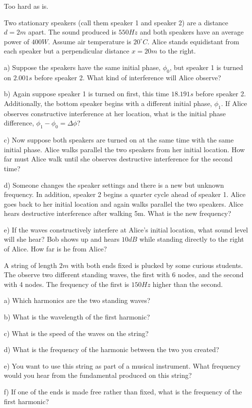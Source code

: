 \documentclass[10pt]{article}
\newenvironment{problem}[2][Problem]{\begin{trivlist}
\item[\hskip \labelsep {\bfseries #1}\hskip \labelsep {\bfseries #2.}]}{\end{trivlist}}
\begin{document}
\begin{problem}{3} Too hard as is.
\item
Two stationary speakers (call them speaker 1 and speaker 2) are a distance $d=2m$ apart. The sound produced is $550Hz$ and both speakers have an average power of $400W$. Assume air temperature is $20^\circ C$. Alice stands equidistant from each speaker but a perpendicular distance $x=20m$ to the right.
\item a) Suppose the speakers have the same initial phase, $\phi_0$, but speaker 1 is turned on $2.001s$ before speaker 2. What kind of interference will Alice observe?
\item b) Again suppose speaker 1 is turned on first, this time $18.191s$ before speaker 2. Additionally, the bottom speaker begins with a different initial phase, $\phi_1$. If Alice observes constructive interference at her location, what is the initial phase difference, $\phi_1-\phi_0=\Delta \phi$?
\item c) Now suppose both speakers are turned on at the same time with the same initial phase. Alice walks parallel the two speakers from her initial location. How far must Alice walk until she observes destructive interference for the second time?
\item d) Someone changes the speaker settings and there is a new but unknown frequency. In addition, speaker 2 begins a quarter cycle ahead of speaker 1. Alice goes back to her initial location and again walks parallel the two speakers. Alice hears destructive interference after walking 5m. What is the new frequency?
\item e) If the waves constructively interfere at Alice's initial location, what sound level will she hear? Bob shows up and hears $10dB$ while standing directly to the right of Alice. How far is he from Alice?

\end{problem}

\begin{problem}{4}
A string of length $2m$ with both ends fixed is plucked by some curious students. The observe two different standing waves, the first with 6 nodes, and the second with 4 nodes. The frequency of the first is $150Hz$ higher than the second.
\item a) Which harmonics are the two standing waves?
\item b) What is the wavelength of the first harmonic?
\item c) What is the speed of the waves on the string?
\item d) What is the frequency of the harmonic between the two you created?
\item e) You want to use this string as part of a musical instrument. What frequency would you hear from the fundamental produced on this string?
\item f) If one of the ends is made free rather than fixed, what is the frequency of the first harmonic?
\end{problem}
\end{document}
